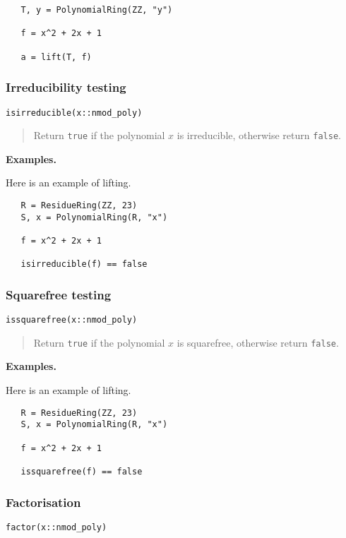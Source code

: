 \documentclass[a4paper,10pt]{article}
\newcommand{\code}{\lstinline}
\newcommand{\desc}[1]{\vspace{-3mm}\begin{quote}#1\end{quote}}
\begin{document}
{{\begin{lstlisting}
   T, y = PolynomialRing(ZZ, "y")

   f = x^2 + 2x + 1

   a = lift(T, f) 
\end{lstlisting}

\subsubsection{Irreducibility testing}

\begin{lstlisting}
isirreducible(x::nmod_poly)
\end{lstlisting}

\desc{Return \code{true} if the polynomial $x$ is irreducible, otherwise return \code{false}.}

\textbf{Examples.}

Here is an example of lifting.

\begin{lstlisting}
   R = ResidueRing(ZZ, 23)
   S, x = PolynomialRing(R, "x")

   f = x^2 + 2x + 1

   isirreducible(f) == false
\end{lstlisting}

\subsubsection{Squarefree testing}

\begin{lstlisting}
issquarefree(x::nmod_poly)
\end{lstlisting}

\desc{Return \code{true} if the polynomial $x$ is squarefree, otherwise return \code{false}.}

\textbf{Examples.}

Here is an example of lifting.

\begin{lstlisting}
   R = ResidueRing(ZZ, 23)
   S, x = PolynomialRing(R, "x")

   f = x^2 + 2x + 1

   issquarefree(f) == false
\end{lstlisting}

\subsubsection{Factorisation}

\begin{lstlisting}
factor(x::nmod_poly)
\end{lstlisting}

}}
\end{document}
